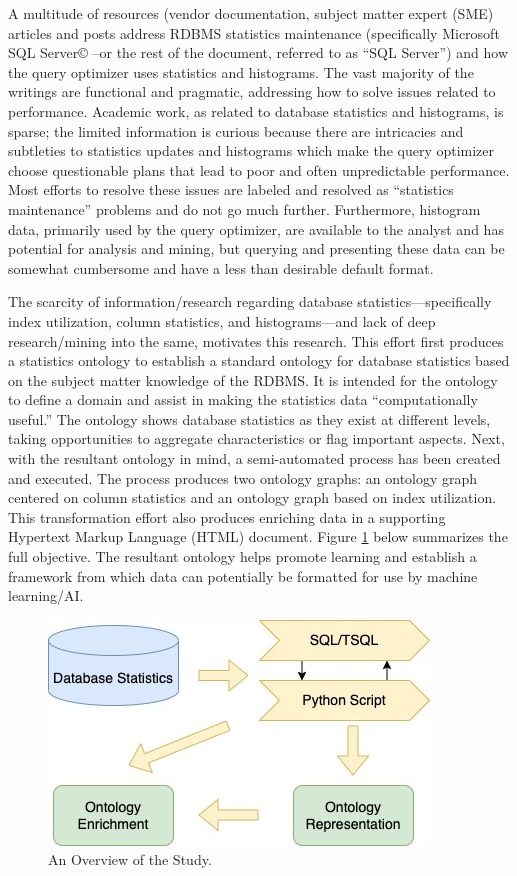 \documentclass[sigconf]{acmart}
\begin{document}
A multitude of resources (vendor documentation, subject matter expert (SME) articles
and posts \cite{RWesta, RWestb, RWestc} address RDBMS statistics maintenance
(specifically Microsoft SQL Server© --or the rest of the document, referred to as “SQL Server”)
and how the query optimizer uses statistics and histograms. The vast majority of the writings are
functional and pragmatic, addressing how to solve issues related to performance. Academic
work, as related to database statistics and histograms, is sparse; the limited information is curious because there are intricacies and subtleties to statistics updates and histograms which make the query optimizer choose questionable plans that lead to poor and often unpredictable
performance. Most efforts to resolve these issues are labeled and resolved as “statistics
maintenance” problems and do not go much further. Furthermore, histogram data, primarily used
by the query optimizer, are available to the analyst and has potential for analysis and mining, but
querying and presenting these data can be somewhat cumbersome and have a less than desirable default format.

The scarcity of information/research regarding database statistics—specifically index
utilization, column statistics, and histograms—and lack of deep research/mining into the same,
motivates this research. This effort first produces a statistics ontology to establish a standard
ontology for database statistics based on the subject matter knowledge of the RDBMS. It is
intended for the ontology to define a domain and assist in making the statistics data
“computationally useful.” The ontology shows database statistics as they exist at different levels,
taking opportunities to aggregate characteristics or flag important aspects. Next, with the
resultant ontology in mind, a semi-automated process has been created and executed. The
process produces two ontology graphs: an ontology graph centered on column statistics and an
ontology graph based on index utilization. This transformation effort also produces enriching
data in a supporting Hypertext Markup Language (HTML) document. Figure \ref{overview} below 
summarizes the full objective. The resultant ontology helps promote learning and establish a
framework from which data can potentially be formatted for use by machine learning/AI.

\begin{figure}[h]
	\centering
	\includegraphics[width=0.8\linewidth]{db-statistics-ontology}
	\caption{An Overview of the Study.}
	\label{overview}
\end{figure}
\end{document}
